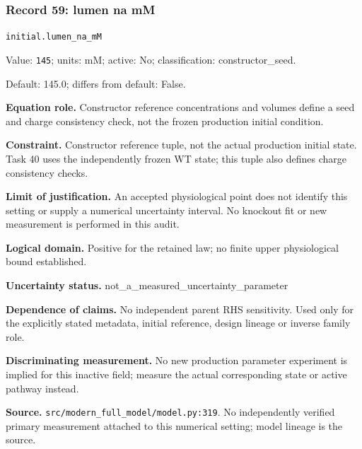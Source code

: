 \subsubsection*{Record 59: lumen na mM}
{\small \nolinkurl{initial.lumen_na_mM}\par

Value: \texttt{145}; units: mM; active: No; classification: constructor\_seed.\par

Default: 145.0; differs from default: False.\par

\textbf{Equation role.} Constructor reference concentrations and volumes define a seed and charge consistency check, not the frozen production initial condition.\par

\textbf{Constraint.} Constructor reference tuple, not the actual production initial state. Task 40 uses the independently frozen WT state; this tuple also defines charge consistency checks.\par

\textbf{Limit of justification.} An accepted physiological point does not identify this setting or supply a numerical uncertainty interval. No knockout fit or new measurement is performed in this audit.\par

\textbf{Logical domain.} Positive for the retained law; no finite upper physiological bound established.\par

\textbf{Uncertainty status.} not\_a\_measured\_uncertainty\_parameter\par

\textbf{Dependence of claims.} No independent parent RHS sensitivity. Used only for the explicitly stated metadata, initial reference, design lineage or inverse family role.\par

\textbf{Discriminating measurement.} No new production parameter experiment is implied for this inactive field; measure the actual corresponding state or active pathway instead.\par

\textbf{Source.} \nolinkurl{src/modern_full_model/model.py:319}. No independently verified primary measurement attached to this numerical setting; model lineage is the source.\par}

